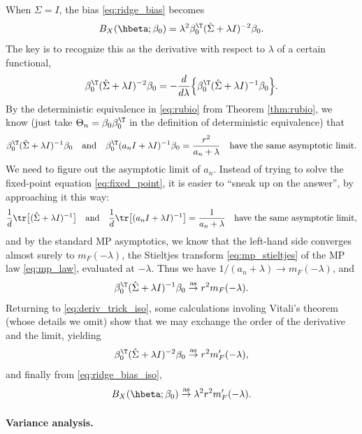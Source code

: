 \documentclass{article}
\begin{document}
When $\Sigma = I$, the bias \eqref{eq:ridge_bias} becomes 
\begin{equation}
\label{eq:ridge_bias_iso}
B_X(\hbeta; \beta_0) = \lambda^2 \beta_0^\T (\hSigma + \lambda I)^{-2}
\beta_0.  
\end{equation}
The key is to recognize this as the derivative with respect to $\lambda$ of a
certain functional,
\begin{equation}
\label{eq:deriv_trick_iso}
\beta_0^\T (\hSigma + \lambda I)^{-2} \beta_0 = - \frac{d}{d\lambda} \Big \{
\beta_0^\T (\hSigma + \lambda I)^{-1} \beta_0 \Big\}.
\end{equation}
By the deterministic equivalence in \eqref{eq:rubio} from Theorem
\ref{thm:rubio}, we know (just take $\Theta_n = \beta_0\beta_0^\T$ in the 
definition of deterministic equivalence) that   
\[
\beta_0^\T (\hSigma + \lambda I)^{-1} \beta_0 \quad \text{and} \quad 
\beta_0^\T (a_n I + \lambda I)^{-1} \beta_0 = \frac{r^2}{a_n + \lambda} \quad
\text{have the same asymptotic limit}. 
\]
We need to figure out the asymptotic limit of $a_n$. Instead of trying to
solve the fixed-point equation \eqref{eq:fixed_point}, it is easier to ``sneak
up on the answer'', by approaching it this way:
\[
\frac{1}{d} \tr \big[ (\hSigma + \lambda I)^{-1} \big] \quad \text{and} \quad 
\frac{1}{d} \tr \big[ (a_n I + \lambda I)^{-1} \big] = \frac{1}{a_n + \lambda}
\quad \text{have the same asymptotic limit},  
\]
and by the standard MP asymptotics, we know that the left-hand side converges
almost surely to $m_F(-\lambda)$, the Stieltjes transform
\eqref{eq:mp_stieltjes} of the MP law \eqref{eq:mp_law}, evaluated at
$-\lambda$. Thus we have $1/(a_n + \lambda) \to m_F(-\lambda)$, and 
\[
\beta_0^\T (\hSigma + \lambda I)^{-1} \beta_0 \asto r^2 m_F(-\lambda).
\]
Returning to \eqref{eq:deriv_trick_iso}, some calculations involing Vitali's
theorem (whose details we omit) show that we may exchange the order of the 
derivative and the limit, yielding 
\[
\beta_0^\T (\hSigma + \lambda I)^{-2} \beta_0 \asto r^2 m'_F(-\lambda), 
\]
and finally from \eqref{eq:ridge_bias_iso}, 
\begin{equation}
\label{eq:ridge_bias_iso_limit}
B_X(\hbeta; \beta_0) \asto \lambda^2 r^2 m'_F(-\lambda).
\end{equation}

\paragraph{Variance analysis.}
\end{document}
